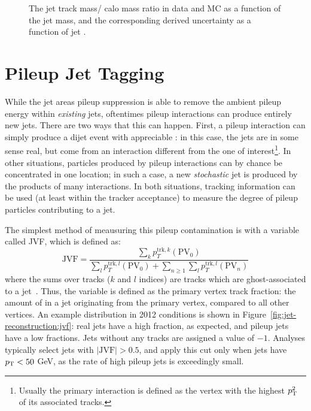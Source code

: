 
\begin{figure}
\centering
{}
\label{fig:jet-reconstruction:jms_uncertainty}
\caption{The jet track mass/ calo mass ratio in data and MC as a function of the jet mass, and the corresponding derived uncertainty as a function of jet \pt.}
\end{figure}


\section{Pileup Jet Tagging}
\label{jet-reconstruction:pileup-jet-tagging}

While the jet areas pileup suppression is able to remove the ambient pileup energy within \textit{existing} jets, oftentimes pileup interactions can produce entirely new jets. There are two ways that this can happen. First, a pileup interaction can simply produce a dijet event with appreciable \pt: in this case, the jets are in some sense real, but come from an interaction different from the one of interest\footnote{Usually the primary interaction is defined as the vertex with the highest $p_{\text{T}}^2$ of its associated tracks.}. In other situations, particles produced by pileup interactions can by chance be concentrated in one location; in such a case, a new \textit{stochastic} jet is produced by the products of many interactions. In both situations, tracking information can be used (at least within the tracker acceptance) to measure the degree of pileup particles contributing to a jet.

The simplest method of meausuring this pileup contamination is with a variable called JVF, which is defined as:
%
\begin{equation}
\label{eqn:jet-reconstruction:jvf}
\mathrm{JVF} = \frac{\sum_k p_T^{\mathrm{trk},k}(\mathrm{PV}_0)}{ \sum_l p_T^{\mathrm{trk},l}(\mathrm{PV}_0) + \sum_{n\geq1} \sum_l p_T^{\mathrm{trk},l}(\mathrm{PV}_n)}
\end{equation}
%
where the sums over tracks ($k$ and $l$ indices) are tracks which are ghost-associated to a jet~\cite{ATLAS-JVF}. Thus, the variable is defined as the primary vertex track \pt fraction: the amount of \pt in a jet originating from the primary vertex, compared to all other vertices. An example distribution in 2012 conditions is shown in Figure~\ref{fig:jet-reconstruction:jvf}: real jets have a high fraction, as expected, and pileup jets have a low fractions. Jets without any tracks are assigned a value of $-1$. Analyses typically select jets with $|\mathrm{JVF}| > 0.5$, and apply this cut only when jets have $p_{\text{T}} < 50$ GeV, as the rate of high \pt pileup jets is exceedingly small. 

